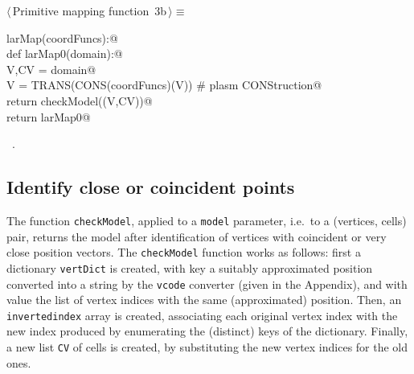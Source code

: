 \documentclass[11pt,oneside]{article}	%
\begin{document}
\begin{flushleft} \small \label{scrap3}
\protect{}$\langle\,$Primitive mapping function\nobreak\ {\footnotesize 3b}$\,\rangle\equiv$
\vspace{-1ex}
\begin{list}{}{} \item
\mbox{}\verb@def larMap(coordFuncs):@\\
\mbox{}\verb@   def larMap0(domain):@\\
\mbox{}\verb@      V,CV = domain@\\
\mbox{}\verb@      V = TRANS(CONS(coordFuncs)(V))  # plasm CONStruction@\\
\mbox{}\verb@      return checkModel((V,CV))@\\
\mbox{}\verb@   return larMap0@\\
\mbox{}\verb@@{\NWsep}
\end{list}
\vspace{-1ex}
\footnotesize\addtolength{\baselineskip}{-1ex}
\begin{list}{}{\setlength{\itemsep}{-\parsep}\setlength{\itemindent}{-\leftmargin}}
\item \NWtxtMacroRefIn\ .
\end{list}
\end{flushleft}

\subsection{Identify close or coincident points}

The function \texttt{checkModel}, applied to a \texttt{model} parameter, i.e.~to a (vertices, cells)  pair, returns the model after identification of vertices with coincident or very close position vectors.
The \texttt{checkModel} function works as follows: first a dictionary \texttt{vertDict} is created, with key a suitably approximated position converted into a string by the \texttt{vcode} converter (given in the Appendix), and with value the list of vertex indices with the same (approximated) position. Then, an \texttt{invertedindex} array is created, associating each original vertex index with the new index produced by enumerating the (distinct) keys of the dictionary. Finally, a new list \texttt{CV} of cells is created, by substituting the new vertex indices for the old ones. 
\end{document}
